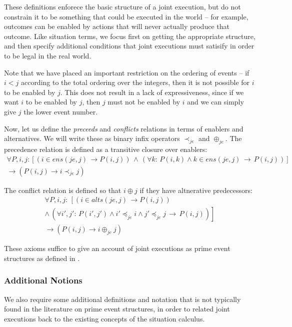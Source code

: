 These definitions enforece the basic structure of a joint execution,
but do not constrain it to be something that could be executed in
the world -- for example, outcomes can be enabled by actions that
will never actually produce that outcome. Like situation terms, we
focus first on getting the appropriate structure, and then specify
additional conditions that joint executions must satisify in order
to be legal in the real world.

Note that we have placed an important restriction on the ordering
of events -- if $i<j$ according to the total ordering over the integers,
then it is not possible for $i$ to be enabled by $j$. This does
not result in a lack of expressiveness, since if we want $i$ to be
enabled by $j$, then $j$ must not be enabled by $i$ and we can
simply give $j$ the lower event number.

Now, let us define the \emph{preceeds }and \emph{conflicts }relations
in terms of enablers and alternatives. We will write these as binary
infix operators $\prec_{je}$ and $\oplus_{je}$. The precedence relation
is defined as a transitive closure over enablers:\begin{multline*}
\forall P,i,j:\left[\left(i\in ens(je,j)\,\rightarrow P(i,j)\right)\,\wedge\,\left(\forall k:\, P(i,k)\wedge k\in ens(je,j)\,\rightarrow\, P(i,j)\right)\right]\\
\rightarrow\left(P(i,j)\rightarrow i\prec_{je}j\right)\end{multline*}


The conflict relation is defined so that $i\oplus j$ if they have
altnerative predecessors:\begin{multline*}
\forall P,i,j:\,\left[\left(i\in alts(je,j)\,\rightarrow P(i,j)\right)\right.\\
\left.\wedge\,\left(\forall i',j':\, P(i',j')\wedge i'\preceq_{je}i\wedge j'\preceq_{je}j\,\rightarrow\, P(i,j)\right)\right]\\
\rightarrow\left(P(i,j)\rightarrow i\oplus_{je}j\right)\end{multline*}


These axioms suffice to give an account of joint executions as prime
event structures as defined in \citep{npw79event_structures}.


\subsubsection{Additional Notions}

We also require some additional definitions and notation that is not
typically found in the literature on prime event structures, in order
to related joint executions back to the existing concepts of the situation
calculus.

